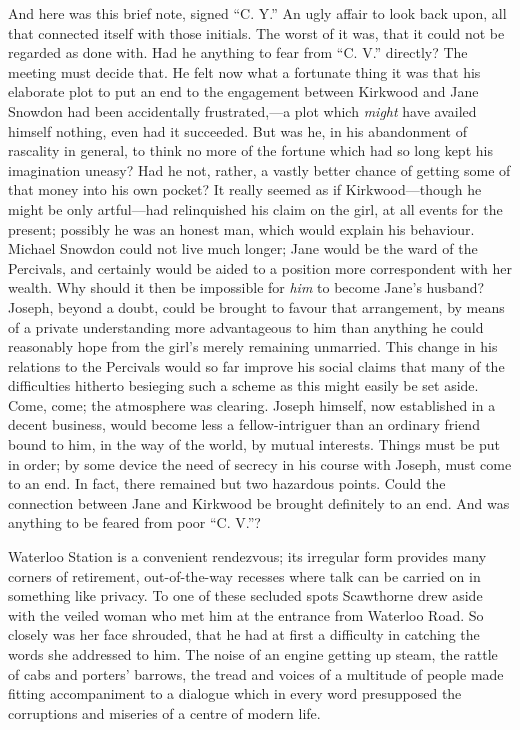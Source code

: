 And here was this brief note, signed ``C. Y.'' An ugly affair to look
back upon, all that connected itself with those initials. The worst of
it was, that it could not be regarded as done with. Had he anything to
fear from ``C. V.'' directly? The meeting must decide that. He felt now
what a fortunate thing it was that his elaborate plot to put an end to
the engagement between Kirkwood and Jane Snowdon had been accidentally
frustrated,---a plot which \emph{might} have availed himself nothing,
even had it succeeded. But was he, in his abandonment of rascality in
general, to think no more of the fortune which had so long kept his
imagination uneasy? Had he not, rather, a vastly better chance of
getting some of that money into his own
{\protect\hypertarget{52}{}{}}pocket? It really seemed as if
Kirkwood---though he might be only artful---had relinquished his claim
on the girl, at all events for the present; possibly he was an honest
man, which would explain his behaviour. Michael Snowdon could not live
much longer; Jane would be the ward of the Percivals, and certainly
would be aided to a position more correspondent with her wealth. Why
should it then be impossible for \emph{him} to become Jane's husband?
Joseph, beyond a doubt, could be brought to favour that arrangement, by
means of a private understanding more advantageous to him than anything
he could reasonably hope from the girl's merely remaining unmarried.
This change in his relations to the Percivals would so far improve his
social claims that many of the difficulties hitherto besieging such a
scheme as this might easily be set aside. Come, come; the atmosphere was
clearing. Joseph himself, now established in a decent business, would
become less a fellow-intriguer than an ordinary friend bound to him, in
the way of the world, by mutual interests. Things must be put in order;
by some device the need of secrecy in his
{\protect\hypertarget{53}{}{}}course with Joseph, must come to an end.
In fact, there remained but two hazardous points. Could the connection
between Jane and Kirkwood be brought definitely to an end. And was
anything to be feared from poor ``C. V.''?

Waterloo Station is a convenient rendezvous; its irregular form provides
many corners of retirement, out-of-the-way recesses where talk can be
carried on in something like privacy. To one of these secluded spots
Scawthorne drew aside with the veiled woman who met him at the entrance
from Waterloo Road. So closely was her face shrouded, that he had at
first a difficulty in catching the words she addressed to him. The noise
of an engine getting up steam, the rattle of cabs and porters' barrows,
the tread and voices of a multitude of people made fitting accompaniment
to a dialogue which in every word presupposed the corruptions and
miseries of a centre of modern life.

